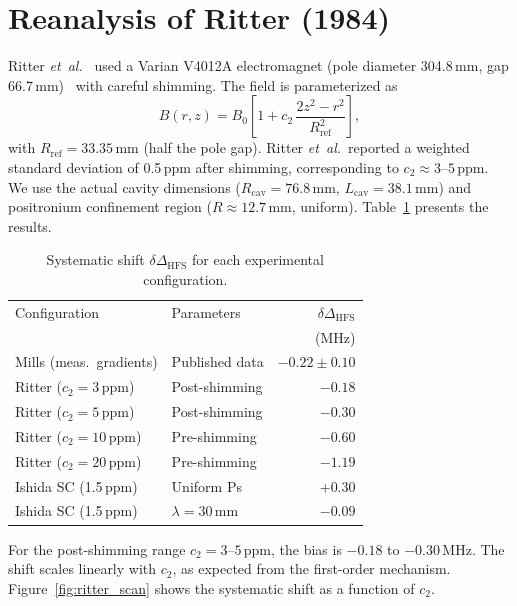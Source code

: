 \documentclass[twocolumn,pra,aps,superscriptaddress,floatfix,10pt]{revtex4-2}
\newcommand{\etal}{\textit{et~al.}}
\begin{document}
\section{Reanalysis of Ritter (1984)}
\label{sec:ritter}

Ritter \etal~\cite{Ritter1984} used a Varian V4012A electromagnet (pole diameter 304.8\,mm, gap 66.7\,mm)~\cite{Theriot1970} with careful shimming. The field is parameterized as
\begin{equation}
  B(r,z) = B_0\left[1 + c_2\,\frac{2z^2 - r^2}{R_\mathrm{ref}^2}\right],
  \label{eq:ritter_field}
\end{equation}
with $R_\mathrm{ref} = 33.35$\,mm (half the pole gap). Ritter \etal\ reported a weighted standard deviation of 0.5\,ppm after shimming, corresponding to $c_2 \approx 3$--$5$\,ppm. We use the actual cavity dimensions ($R_\mathrm{cav} = 76.8$\,mm, $L_\mathrm{cav} = 38.1$\,mm) and positronium confinement region ($R \approx 12.7$\,mm, uniform). Table~\ref{tab:results} presents the results.

\begin{table}[t]
\caption{Systematic shift $\delta\Delta_\mathrm{HFS}$ for each experimental configuration.}
\label{tab:results}
\begin{ruledtabular}
\begin{tabular}{llr}
Configuration & Parameters & $\delta\Delta_\mathrm{HFS}$ \\
 & & (MHz) \\
\hline
Mills (meas.\ gradients) & Published data & $-0.22 \pm 0.10$ \\
Ritter ($c_2 = 3$\,ppm) & Post-shimming & $-0.18$ \\
Ritter ($c_2 = 5$\,ppm) & Post-shimming & $-0.30$ \\
Ritter ($c_2 = 10$\,ppm) & Pre-shimming & $-0.60$ \\
Ritter ($c_2 = 20$\,ppm) & Pre-shimming & $-1.19$ \\
Ishida SC (1.5\,ppm) & Uniform Ps & $+0.30$ \\
Ishida SC (1.5\,ppm) & $\lambda = 30$\,mm & $-0.09$ \\
\end{tabular}
\end{ruledtabular}
\end{table}

For the post-shimming range $c_2 = 3$--$5$\,ppm, the bias is $-0.18$ to $-0.30$\,MHz. The shift scales linearly with $c_2$, as expected from the first-order mechanism. Figure~\ref{fig:ritter_scan} shows the systematic shift as a function of $c_2$.
\end{document}

